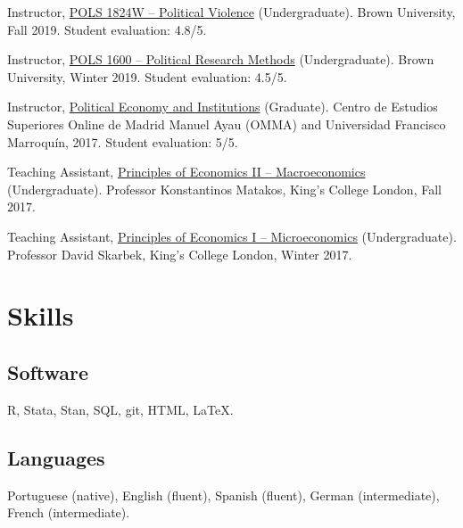 \documentclass[a4paper]{article}
\renewenvironment{itemize}{
	\begin{list}{}{
			\setlength{\leftmargin}{1.5em}
		}
		}{
	\end{list}
}
\begin{document}
\begin{itemize}
\item Instructor, \href{http://danilofreire.github.io/pols1842w}{POLS 1824W -- Political Violence} (Undergraduate). Brown University, Fall 2019. Student evaluation: 4.8/5.
\item Instructor, \href{http://danilofreire.github.io}{POLS 1600 -- Political Research Methods} (Undergraduate). Brown University, Winter 2019. Student evaluation: 4.5/5.
\item Instructor, \href{https://github.com/danilofreire/economia-politica-instituicoes-ufm}{Political Economy and Institutions} (Graduate). Centro de Estudios Superiores Online de Madrid Manuel Ayau (OMMA) and Universidad Francisco Marroquín, 2017. Student evaluation: 5/5.
\item Teaching Assistant, \href{https://github.com/danilofreire/core-econ}{Principles of Economics II -- Macroeconomics} (Undergraduate). Professor Konstantinos Matakos, King's College London, Fall 2017.
\item Teaching Assistant, \href{https://github.com/danilofreire/core-econ}{Principles of Economics I -- Microeconomics} (Undergraduate). Professor David Skarbek, King's College London, Winter 2017.
\end{itemize}

\section*{Skills}

\subsection*{Software}

\begin{itemize}
\item R, Stata, Stan, SQL, git, HTML, \LaTeX{}.
\end{itemize}

\subsection*{Languages}

\begin{itemize}
\item Portuguese (native), English (fluent), Spanish (fluent), German (intermediate), French (intermediate).
\end{itemize}

\end{document}
